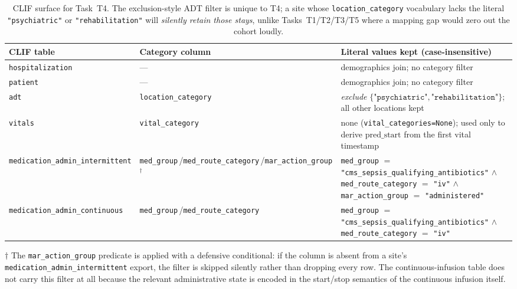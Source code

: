 \documentclass[11pt]{article}
\newcommand{\predstart}{\text{pred\_start}}
\begin{document}
\begin{table}[H]
\centering
\small
\begin{tabular}{@{}llp{6.8cm}@{}}
\toprule
\textbf{CLIF table} & \textbf{Category column} & \textbf{Literal values kept (case-insensitive)} \\
\midrule
\texttt{hospitalization} & ---                         & demographics join; no category filter \\
\texttt{patient}         & ---                         & demographics join; no category filter \\
\texttt{adt}             & \texttt{location\_category} & \emph{exclude} $\{\texttt{"psychiatric"}, \texttt{"rehabilitation"}\}$; all other locations kept \\
\texttt{vitals}          & \texttt{vital\_category}    & none (\texttt{vital\_categories=None}); used only to derive $\predstart$ from the first vital timestamp \\
\texttt{medication\_admin\_intermittent} & \texttt{med\_group}{\tiny\,/}\texttt{med\_route\_category}{\tiny\,/}\texttt{mar\_action\_group}$^{\dagger}$ &
\texttt{med\_group} $=$ \texttt{"cms\_sepsis\_qualifying\_antibiotics"} $\wedge$ \texttt{med\_route\_category} $=$ \texttt{"iv"} $\wedge$ \texttt{mar\_action\_group} $=$ \texttt{"administered"} \\
\texttt{medication\_admin\_continuous}   & \texttt{med\_group}{\tiny\,/}\texttt{med\_route\_category} &
\texttt{med\_group} $=$ \texttt{"cms\_sepsis\_qualifying\_antibiotics"} $\wedge$ \texttt{med\_route\_category} $=$ \texttt{"iv"} \\
\bottomrule
\end{tabular}
\caption{CLIF surface for Task~T4. The exclusion-style ADT filter is
unique to T4; a site whose \texttt{location\_category} vocabulary lacks
the literal \texttt{"psychiatric"} or \texttt{"rehabilitation"} will
\emph{silently retain those stays}, unlike Tasks~T1/T2/T3/T5 where a
mapping gap would zero out the cohort loudly.}
\end{table}

$\dagger$ The \texttt{mar\_action\_group} predicate is applied with a
defensive conditional: if the column is absent from a site's
\texttt{medication\_admin\_intermittent} export, the filter is skipped
silently rather than dropping every row. The continuous-infusion table
does not carry this filter at all because the relevant administrative
state is encoded in the start/stop semantics of the continuous infusion
itself.
\end{document}
